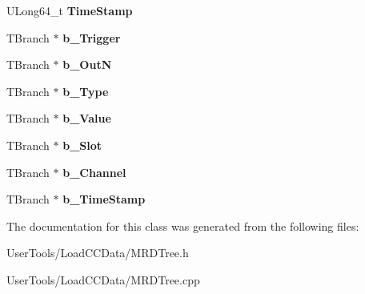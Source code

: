 \begin{DoxyCompactItemize}
\item 
\hypertarget{classMRDTree_abee67bfdf0a6eaf117b85b9b2485612b}{U\-Long64\-\_\-t {\bfseries Time\-Stamp}}\label{classMRDTree_abee67bfdf0a6eaf117b85b9b2485612b}

\item 
\hypertarget{classMRDTree_a555f128842c285877adad7754222feb4}{T\-Branch $\ast$ {\bfseries b\-\_\-\-Trigger}}\label{classMRDTree_a555f128842c285877adad7754222feb4}

\item 
\hypertarget{classMRDTree_abee621e9208bdfcbdb2c2f068e74950d}{T\-Branch $\ast$ {\bfseries b\-\_\-\-Out\-N}}\label{classMRDTree_abee621e9208bdfcbdb2c2f068e74950d}

\item 
\hypertarget{classMRDTree_ae95ac23e8ade856062ca8646cf8b652e}{T\-Branch $\ast$ {\bfseries b\-\_\-\-Type}}\label{classMRDTree_ae95ac23e8ade856062ca8646cf8b652e}

\item 
\hypertarget{classMRDTree_ab5ec56917aad8639be559941dbbbf5f1}{T\-Branch $\ast$ {\bfseries b\-\_\-\-Value}}\label{classMRDTree_ab5ec56917aad8639be559941dbbbf5f1}

\item 
\hypertarget{classMRDTree_a7e22be6df66f4f8da01a836c6ba21251}{T\-Branch $\ast$ {\bfseries b\-\_\-\-Slot}}\label{classMRDTree_a7e22be6df66f4f8da01a836c6ba21251}

\item 
\hypertarget{classMRDTree_a3bb90cc6b5552840b91dfb88ce24d19e}{T\-Branch $\ast$ {\bfseries b\-\_\-\-Channel}}\label{classMRDTree_a3bb90cc6b5552840b91dfb88ce24d19e}

\item 
\hypertarget{classMRDTree_acc8785e5ee2f2702f240bfc1f629decc}{T\-Branch $\ast$ {\bfseries b\-\_\-\-Time\-Stamp}}\label{classMRDTree_acc8785e5ee2f2702f240bfc1f629decc}

\end{DoxyCompactItemize}


The documentation for this class was generated from the following files\-:\begin{DoxyCompactItemize}
\item 
User\-Tools/\-Load\-C\-C\-Data/M\-R\-D\-Tree.\-h\item 
User\-Tools/\-Load\-C\-C\-Data/M\-R\-D\-Tree.\-cpp\end{DoxyCompactItemize}
